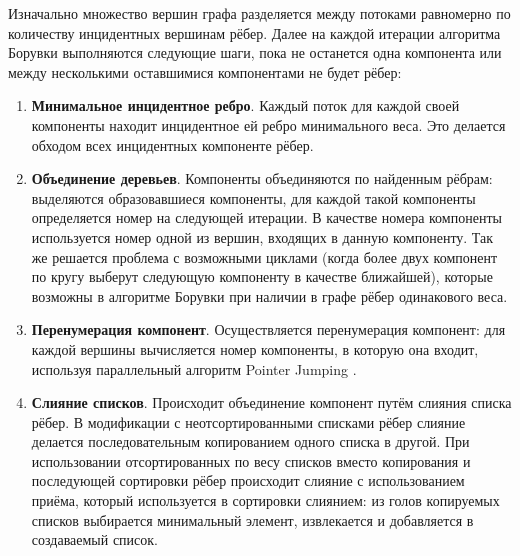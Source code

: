 \documentclass[a4paper,10pt]{extarticle}
\begin{document}
Изначально множество вершин графа разделяется между потоками равномерно по количеству инцидентных вершинам рёбер.
Далее на каждой итерации алгоритма Борувки выполняются следующие шаги, пока не останется одна компонента или между несколькими оставшимися компонентами не будет рёбер:
\begin{enumerate}
    \item \textbf{Минимальное инцидентное ребро}.
        Каждый поток для каждой своей компоненты находит инцидентное ей ребро минимального веса. Это делается обходом всех инцидентных компоненте рёбер.
    \item \textbf{Объединение деревьев}.
        Компоненты объединяются по найденным рёбрам: выделяются образовавшиеся компоненты, для каждой такой компоненты определяется номер на следующей итерации.
        В качестве номера компоненты используется номер одной из вершин, входящих в данную компоненту.
          Так же решается проблема с возможными циклами (когда более двух компонент по кругу выберут следующую компоненту в качестве ближайшей), которые возможны в алгоритме Борувки при наличии в графе рёбер одинакового веса.
    \item \textbf{Перенумерация компонент}.
          Осуществляется перенумерация компонент: для каждой вершины вычисляется номер компоненты, в которую она входит, используя параллельный алгоритм Pointer Jumping \cite{pointer-jumping}. 
    \item \textbf{Слияние списков}.
        Происходит объединение компонент путём слияния списка рёбер. В модификации с неотсортированными списками рёбер слияние делается последовательным копированием одного списка в другой. При использовании отсортированных по весу списков вместо копирования и последующей сортировки рёбер происходит слияние с использованием приёма, который используется в сортировки слиянием: из голов копируемых списков выбирается минимальный элемент, извлекается и добавляется в создаваемый список.
\end{enumerate}
\end{document}

